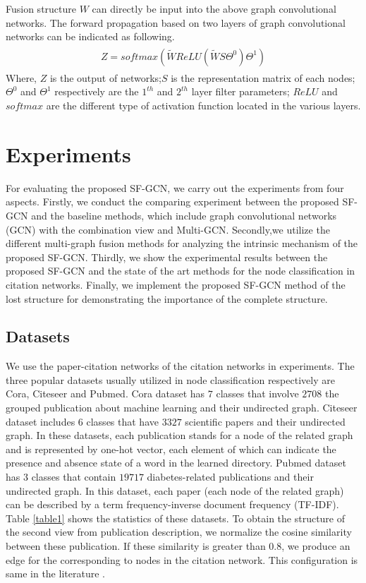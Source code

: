 \documentclass[review]{elsarticle}
\begin{document}
Fusion structure $W$ can directly be input into the above graph convolutional networks. The forward propagation based on two layers of graph convolutional networks can be indicated as following.
\begin{align}
\label{gcn2}
\begin{aligned}
Z=softmax(\tilde{W}ReLU(\tilde{W}S\Theta^{0})\Theta^{1})
\end{aligned}
\end{align}
Where, $Z$ is the output of networks;$S$ is the representation matrix of each nodes;$\Theta^{0}$ and $\Theta^{1}$ respectively are the $1^{th}$ and $2^{th}$ layer filter parameters; $ReLU$ and $softmax$ are the different type of activation function located in the various layers.

\section{Experiments}
For evaluating the proposed SF-GCN, we carry out the experiments from four aspects. Firstly, we conduct the comparing experiment between the proposed SF-GCN and the baseline methods, which include graph convolutional networks (GCN)\cite{kipf2016semi} with the combination view and Multi-GCN\cite{khan2019multi}. Secondly,we utilize the different multi-graph fusion methods for analyzing the intrinsic mechanism of the proposed SF-GCN. Thirdly, we show the experimental results between the proposed SF-GCN and the state of the art methods for the node classification in citation networks. Finally, we implement the proposed SF-GCN method of the lost structure for demonstrating the importance of the complete structure.
\subsection{Datasets}
We use the paper-citation networks of the citation networks in experiments. The three popular datasets usually utilized in node classification respectively are Cora, Citeseer and Pubmed. Cora dataset has $7$ classes that involve $2708$ the grouped publication about machine learning and their undirected graph. Citeseer dataset includes $6$ classes that have $3327$ scientific papers and their undirected graph. In these datasets, each publication stands for a node of the related graph and is represented by one-hot vector, each element of which can indicate the presence and absence state of a word in the learned directory. Pubmed dataset has $3$ classes that contain $19717$ diabetes-related publications and their undirected graph. In this dataset, each paper (each node of the related graph) can be described by a term frequency-inverse document frequency (TF-IDF)\cite{wu2019comprehensive}. Table \ref{table1} shows the statistics of these datasets. To obtain the structure of the second view from publication description, we normalize the cosine similarity between these publication. If these similarity is greater than $0.8$, we produce an edge for the corresponding to nodes in the citation network. This configuration is same in the literature \cite{khan2019multi}.
\end{document}
